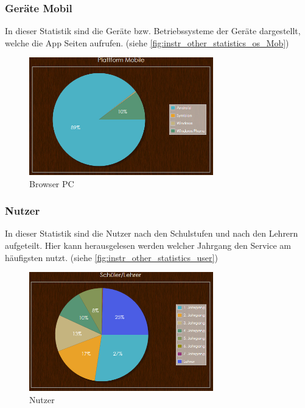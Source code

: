 \subsubsection{Geräte Mobil}
In dieser Statistik sind die Geräte bzw. Betriebssysteme der Geräte dargestellt, welche die App Seiten aufrufen. (siehe \autoref{fig:instr_other_statistics_os_Mob})
\begin{figure}[H]
\centering
\includegraphics[keepaspectratio=true, width=8cm]{images/screenshots/statistics_os_Mob.png}
\caption{Browser PC}
\label{fig:instr_other_statistics_os_Mob}
\end{figure}
\subsubsection{Nutzer}
In dieser Statistik sind die Nutzer nach den Schulstufen und nach den Lehrern aufgeteilt. Hier kann herausgelesen werden welcher Jahrgang den Service am häufigsten nutzt. (siehe \autoref{fig:instr_other_statistics_user})
\begin{figure}[H]
\centering
\includegraphics[keepaspectratio=true, width=8cm]{images/screenshots/statistics_user.png}
\caption{Nutzer}
\label{fig:instr_other_statistics_user}
\end{figure}
